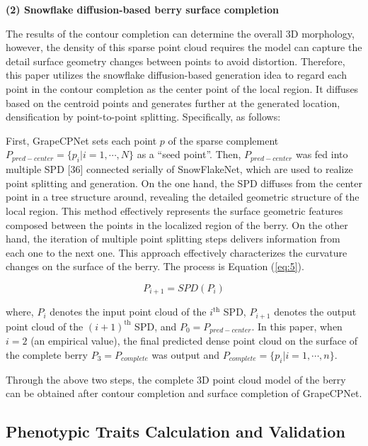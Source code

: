 \documentclass[12pt]{article}
\begin{document}
{\raggedright\textbf{(2) Snowflake diffusion-based berry surface completion}}

The results of the contour completion can determine the overall 3D morphology, however, the density of this sparse point cloud requires the model can capture the detail surface geometry changes between points to avoid distortion. 
Therefore, this paper utilizes the snowflake diffusion-based generation idea to regard each point in the contour completion as the center point of the local region. 
It diffuses based on the centroid points and generates further at the generated location, densification by point-to-point splitting. 
Specifically, as follows:

First, GrapeCPNet sets each point $p$ of the sparse complement $P_{pred-center}=\{p_i |i=1,\cdots,N\}$ as a ``seed point''. 
Then, $P_{pred-center}$ was fed into multiple SPD [36] connected serially of SnowFlakeNet, which are used to realize point splitting and generation. 
On the one hand, the SPD diffuses from the center point in a tree structure around, revealing the detailed geometric structure of the local region. 
This method effectively represents the surface geometric features composed between the points in the localized region of the berry. 
On the other hand, the iteration of multiple point splitting steps delivers information from each one to the next one. 
This approach effectively characterizes the curvature changes on the surface of the berry. The process is Equation (\ref{eq:5}).

\begin{equation}
    P_{i+1} = SPD(P_i)
    \label{eq:5}
\end{equation}

{\raggedright where, $P_i$ denotes the input point cloud of the $i^{\text{th}}$ SPD, $P_{i+1}$ denotes the output point cloud of the $(i+1)^{\text{th}}$ SPD, and $P_0=P_{pred-center}$. 
In this paper, when $i=2$ (an empirical value), the final predicted dense point cloud on the surface of the complete berry $P_3=P_{complete}$ was output and $P_{complete}=\{p_i |i=1,\cdots,n\}$.}

Through the above two steps, the complete 3D point cloud model of the berry can be obtained after contour completion and surface completion of GrapeCPNet.

\subsection{Phenotypic Traits Calculation and Validation}
\end{document}

